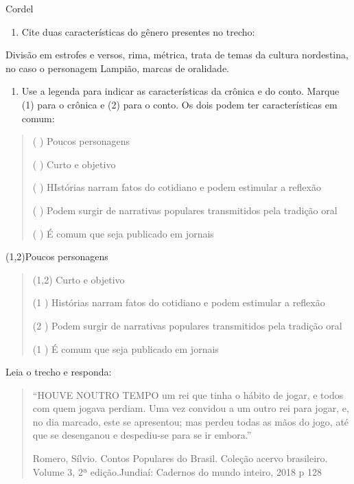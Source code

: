 {Cordel

\begin{enumerate}
\def\labelenumi{\arabic{enumi})}
\setcounter{enumi}{3}
\tightlist
\item
  Cite duas características do gênero presentes no trecho:
\end{enumerate}

Divisão em estrofes e versos, rima, métrica, trata de temas da cultura
nordestina, no caso o personagem Lampião, marcas de oralidade.

\begin{enumerate}
\def\labelenumi{\arabic{enumi})}
\setcounter{enumi}{4}
\tightlist
\item
  Use a legenda para indicar as características da crônica e do conto.
  Marque (1) para o crônica e (2) para o conto. Os dois podem ter
  características em comum:
\end{enumerate}

\begin{quote}
( ) Poucos personagens

( ) Curto e objetivo

( ) HIstórias narram fatos do cotidiano e podem estimular a reflexão

( ) Podem surgir de narrativas populares transmitidos pela tradição oral

( ) É comum que seja publicado em jornais
\end{quote}

(1,2)Poucos personagens

\begin{quote}
(1,2) Curto e objetivo

(1 ) Histórias narram fatos do cotidiano e podem estimular a reflexão

(2 ) Podem surgir de narrativas populares transmitidos pela tradição
oral

(1 ) É comum que seja publicado em jornais
\end{quote}

Leia o trecho e responda:

\begin{quote}
``HOUVE NOUTRO TEMPO um rei que tinha o hábito de jogar, e todos com
quem jogava perdiam. Uma vez convidou a um outro rei para jogar, e, no
dia marcado, este se apresentou; mas perdeu todas as mãos do jogo, até
que se desenganou e despediu-se para se ir embora.''

Romero, Sílvio. Contos Populares do Brasil. Coleção acervo brasileiro.
Volume 3, 2ª edição.Jundiaí: Cadernos do mundo inteiro, 2018 p 128
\end{quote}

}
